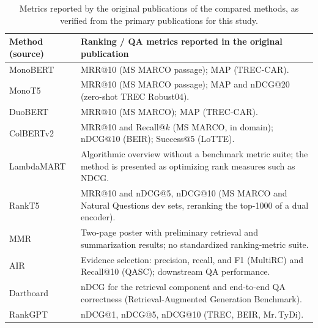 \documentclass[11pt,a4paper]{article}
\begin{document}
\begin{table}[H]
\centering
\small
\begin{tabularx}{\textwidth}{>{\raggedright\arraybackslash}p{2.6cm}>{\raggedright\arraybackslash}X}
\toprule
\textbf{Method (source)} & \textbf{Ranking / QA metrics reported in the original publication}\\
\midrule
MonoBERT \citep{nogueira-cho-2019-passage,nogueira-etal-2019-multistage} & MRR@10 (MS MARCO passage); MAP (TREC-CAR).\\
MonoT5 \citep{nogueira-etal-2020-document} & MRR@10 (MS MARCO passage); MAP and nDCG@20 (zero-shot TREC Robust04).\\
DuoBERT \citep{nogueira-etal-2019-multistage} & MRR@10 (MS MARCO); MAP (TREC-CAR).\\
ColBERTv2 \citep{santhanam-etal-2022-colbertv2} & MRR@10 and Recall@$k$ (MS MARCO, in domain); nDCG@10 (BEIR); Success@5 (LoTTE).\\
LambdaMART \citep{burges-2010-lambdamart} & Algorithmic overview without a benchmark metric suite; the method is presented as optimizing rank measures such as NDCG.\\
RankT5 \citep{zhuang-etal-2023-rankt5} & MRR@10 and nDCG@5, nDCG@10 (MS MARCO and Natural Questions dev sets, reranking the top-1000 of a dual encoder).\\
MMR \citep{carbonell-goldstein-1998-mmr} & Two-page poster with preliminary retrieval and summarization results; no standardized ranking-metric suite.\\
AIR \citep{yadav-etal-2020-unsupervised} & Evidence selection: precision, recall, and F1 (MultiRC) and Recall@10 (QASC); downstream QA performance.\\
Dartboard \citep{pickett-etal-2024-rig} & nDCG for the retrieval component and end-to-end QA correctness (Retrieval-Augmented Generation Benchmark).\\
RankGPT \citep{sun-etal-2023-chatgpt} & nDCG@1, nDCG@5, nDCG@10 (TREC, BEIR, Mr.\,TyDi).\\
\bottomrule
\end{tabularx}
\caption{Metrics reported by the original publications of the compared methods, as verified from the primary publications for this study.}
\label{tab:metrics-lit}
\end{table}
\end{document}

